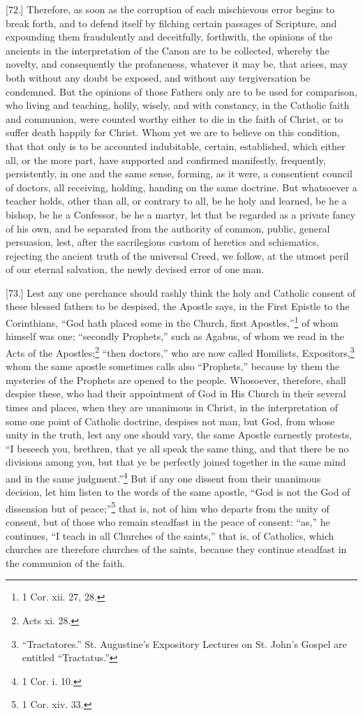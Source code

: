 [72.] Therefore, as soon as the corruption of each mischievous error begins to break forth, and to defend itself by filching certain passages of Scripture, and expounding them fraudulently and deceitfully, forthwith, the opinions of the ancients in the interpretation of the Canon are to be collected, whereby the novelty, and consequently the profaneness, whatever it may be, that arises, may both without any doubt be exposed, and without any tergiversation be condemned. But the opinions of those Fathers only are to be used for comparison, who living and teaching, holily, wisely, and with constancy, in the Catholic faith and communion, were counted worthy either to die in the faith of Christ, or to suffer death happily for Christ. Whom yet we are to believe on this condition, that that only is to be accounted indubitable, certain, established, which either all, or the more part, have supported and confirmed manifestly, frequently, persistently, in one and the same sense, forming, as it were, a consentient council of doctors, all receiving, holding, handing on the same doctrine. But whatsoever a teacher holds, other than all, or contrary to all, be he holy and learned, be he a bishop, be he a Confessor, be he a martyr, let that be regarded as a private fancy of his own, and be separated from the authority of common, public, general persuasion, lest, after the sacrilegious custom of heretics and schismatics, rejecting the ancient truth of the universal Creed, we follow, at the utmost peril of our eternal salvation, the newly devised error of one man.

[73.] Lest any one perchance should rashly think the holy and Catholic consent of these blessed fathers to be despised, the Apostle says, in the First Epistle to the Corinthians, “God hath placed some in the Church, first Apostles,”\footnote{1 Cor. xii. 27, 28.} of whom himself was one; “secondly Prophets,” such as Agabus, of whom we read in the Acts of the Apostles;\footnote{Acts xi. 28.} “then doctors,” who are now called Homilists, Expositors,\footnote{“Tractatores.” St. Augustine’s Expository Lectures on St. John’s Gospel are entitled “Tractatus.”} whom the same apostle sometimes calls also “Prophets,” because by them the mysteries of the Prophets are opened to the people. Whosoever, therefore, shall despise these, who had their appointment of God in His Church in their several times and places, when they are unanimous in Christ, in the interpretation of some one point of Catholic doctrine, despises not man, but God, from whose unity in the truth, lest any one should vary, the same Apostle earnestly protests, “I beseech you, brethren, that ye all speak the same thing, and that there be no divisions among you, but that ye be perfectly joined together in the same mind and in the same judgment.”\footnote{1 Cor. i. 10.} But if any one dissent from their unanimous decision, let him listen to the words of the same apostle, “God is not the God of dissension but of peace;”\footnote{1 Cor. xiv. 33.} that is, not of him who departs from the unity of consent, but of those who remain steadfast in the peace of consent: “as,” he continues, “I teach in all Churches of the saints,” that is, of Catholics, which churches are therefore churches of the saints, because they continue steadfast in the communion of the faith.

